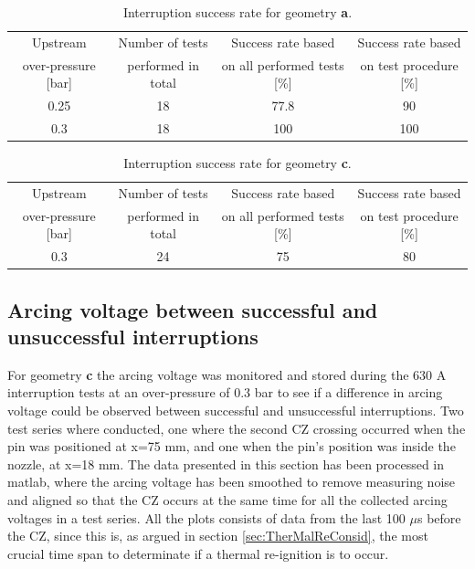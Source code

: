 \documentclass[10pt,b5paper,twoside]{article}
\begin{document}
\begin{table}[H]
\center
\caption{Interruption success rate for geometry \textbf{a}.}
\begin{tabular}{|c|c|c|c|}
\hline 
Upstream & Number of tests & Success rate based & Success rate based \\ over-pressure [bar] &  performed in total &  on all performed tests [\%] &  on test procedure [\%] \\ 
\hline 
0.25 & 18 & 77.8 & 90 \\ 
\hline 
0.3 & 18 & 100 & 100 \\ 
\hline 
\end{tabular} 
\label{tab:successrate1}
\end{table}

\begin{table}[H]
\center
\caption{Interruption success rate for geometry \textbf{c}.}
\begin{tabular}{|c|c|c|c|}
\hline 
Upstream & Number of tests & Success rate based & Success rate based \\ over-pressure [bar] &  performed in total &  on all performed tests [\%] &  on test procedure [\%] \\ 
\hline 
0.3 & 24 & 75 & 80 \\ 
\hline  
\end{tabular} 
\label{tab:successrate2}
\end{table}


\newpage
\subsection{Arcing voltage between successful and unsuccessful interruptions} \label{sec:arcingVoltageSuccessFulandUnsuccessfulResults}
For geometry \textbf{c} the arcing voltage was monitored and stored during the 630 A interruption tests at an over-pressure of 0.3 bar to see if a difference in arcing voltage could be observed between successful and unsuccessful interruptions. Two test series where conducted, one where the second CZ crossing occurred when the pin was positioned at x=75 mm, and one when the pin's position was inside the nozzle, at x=18 mm. The data presented in this section has been processed in matlab, where the arcing voltage has been smoothed to remove measuring noise and aligned so that the CZ occurs at the same time for all the collected arcing voltages in a test series. All the plots consists of data from the last 100 $\mu$s before the CZ, since this is, as argued in section \ref{sec:TherMalReConsid}, the most crucial time span to determinate if a thermal re-ignition is to occur.
\end{document}

